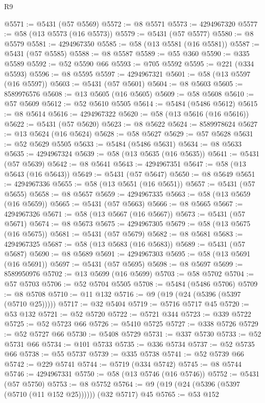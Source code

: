 \begin{lexlean}{R9}
\begin{coremodule}
@5571 := @5431 (@57 @5569)
@5572 := @8 @5571
@5573 := 4294967320
@5577 := @58 (@13 @5573 (@16 @5573))
@5579 := @5431 (@57 @5577)
@5580 := @8 @5579
@5581 := 4294967350
@5585 := @58 (@13 @5581 (@16 @5581))
@5587 := @5431 (@57 @5585)
@5588 := @8 @5587
@5589 := @55 @360
@5590 := @335 @5589
@5592 := @52 @5590 @66
@5593 := @705 @5592
@5595 := @221 (@334 @5593)
@5596 := @8 @5595
@5597 := 4294967321
@5601 := @58 (@13 @5597 (@16 @5597))
@5603 := @5431 (@57 @5601)
@5604 := @8 @5603
@5605 := 8589976576
@5608 := @13 @5605 (@16 @5605)
@5609 := @58 @5608
@5610 := @57 @5609
@5612 := @52 @5610 @5505
@5614 := @5484 (@5486 @5612)
@5615 := @8 @5614
@5616 := 4294967322
@5620 := @58 (@13 @5616 (@16 @5616))
@5622 := @5431 (@57 @5620)
@5623 := @8 @5622
@5624 := 8589978624
@5627 := @13 @5624 (@16 @5624)
@5628 := @58 @5627
@5629 := @57 @5628
@5631 := @52 @5629 @5505
@5633 := @5484 (@5486 @5631)
@5634 := @8 @5633
@5635 := 4294967324
@5639 := @58 (@13 @5635 (@16 @5635))
@5641 := @5431 (@57 @5639)
@5642 := @8 @5641
@5643 := 4294967351
@5647 := @58 (@13 @5643 (@16 @5643))
@5649 := @5431 (@57 @5647)
@5650 := @8 @5649
@5651 := 4294967336
@5655 := @58 (@13 @5651 (@16 @5651))
@5657 := @5431 (@57 @5655)
@5658 := @8 @5657
@5659 := 4294967335
@5663 := @58 (@13 @5659 (@16 @5659))
@5665 := @5431 (@57 @5663)
@5666 := @8 @5665
@5667 := 4294967326
@5671 := @58 (@13 @5667 (@16 @5667))
@5673 := @5431 (@57 @5671)
@5674 := @8 @5673
@5675 := 4294967305
@5679 := @58 (@13 @5675 (@16 @5675))
@5681 := @5431 (@57 @5679)
@5682 := @8 @5681
@5683 := 4294967325
@5687 := @58 (@13 @5683 (@16 @5683))
@5689 := @5431 (@57 @5687)
@5690 := @8 @5689
@5691 := 4294967303
@5695 := @58 (@13 @5691 (@16 @5691))
@5697 := @5431 (@57 @5695)
@5698 := @8 @5697
@5699 := 8589950976
@5702 := @13 @5699 (@16 @5699)
@5703 := @58 @5702
@5704 := @57 @5703
@5706 := @52 @5704 @5505
@5708 := @5484 (@5486 @5706)
@5709 := @8 @5708
@5710 := @11 @132
@5716 := @9 (@19 (@24 (@5396 (@5397 (@5710 @25)))))
@5717 := @32 @5404
@5719 := @5716 @5717 @45
@5720 := @53 @132
@5721 := @52 @5720
@5722 := @5721 @344
@5723 := @339 @5722
@5725 := @52 @5723 @66
@5726 := @5410 @5725
@5727 := @338 @5726
@5729 := @52 @5727 @66
@5730 := @5408 @5729
@5731 := @337 @5730
@5733 := @52 @5731 @66
@5734 := @101 @5733
@5735 := @336 @5734
@5737 := @52 @5735 @66
@5738 := @55 @5737
@5739 := @335 @5738
@5741 := @52 @5739 @66
@5742 := @229 @5741
@5744 := @5719 (@334 @5742)
@5745 := @8 @5744
@5746 := 4294967331
@5750 := @58 (@13 @5746 (@16 @5746))
@5752 := @5431 (@57 @5750)
@5753 := @8 @5752
@5764 := @9 (@19 (@24 (@5396 (@5397 (@5710 (@11 @152 @25)))))) (@32 @5717) @45
@5765 := @53 @152

\end{coremodule}
\end{lexlean}
